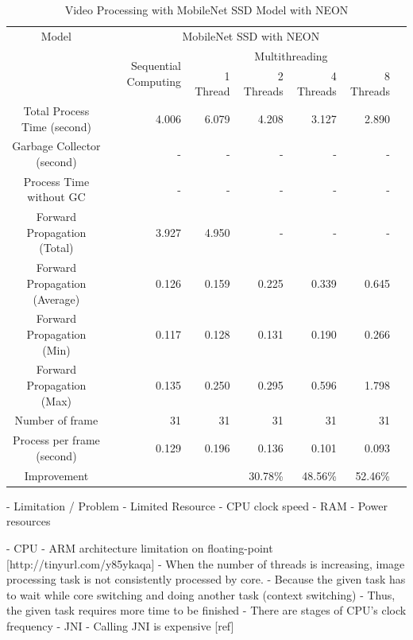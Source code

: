         \begin{table}[!htp]\centering
            \scriptsize
            \begin{tabular}{lrrrrrrr}\toprule
                \multicolumn{2}{c}{Model} &\multicolumn{5}{c}{MobileNet SSD with NEON} \\\cmidrule{1-7}
                \multicolumn{2}{c}{\multirow{2}{*}{}} &\multirow{2}{*}{Sequential Computing} &\multicolumn{4}{c}{Multithreading} \\\cmidrule{4-7}
                & & &1 Thread &2 Threads &4 Threads &8 Threads \\\midrule
                \multicolumn{2}{c}{Total Process Time (second)} &4.006 &6.079 &4.208 &3.127 &2.890 \\
                \multicolumn{2}{c}{Garbage Collector (second)} &- &- &- &- &- \\
                \multicolumn{2}{c}{Process Time without GC} &- &- &- &- &- \\
                \multicolumn{2}{c}{Forward Propagation (Total)} &3.927 &4.950 &- &- &- \\
                \multicolumn{2}{c}{Forward Propagation (Average)} &0.126 &0.159 &0.225 &0.339 &0.645 \\
                \multicolumn{2}{c}{Forward Propagation (Min)} &0.117 &0.128 &0.131 &0.190 &0.266 \\
                \multicolumn{2}{c}{Forward Propagation (Max)} &0.135 &0.250 &0.295 &0.596 &1.798 \\
                \multicolumn{2}{c}{Number of frame} &31 &31 &31 &31 &31 \\
                \multicolumn{2}{c}{Process per frame (second)} &0.129 &0.196 &0.136 &0.101 &0.093 \\
                \multicolumn{2}{c}{Improvement} & & &30.78\% &48.56\% &52.46\% \\
                \bottomrule
            \end{tabular}

            \caption{Video Processing with MobileNet SSD Model with NEON}\label{ssd:neon-performance}
        \end{table}

        -	Limitation / Problem
            - Limited Resource
                - CPU clock speed
                - RAM
                - Power resources

            - CPU
                - ARM architecture limitation on floating-point [http://tinyurl.com/y85ykaqa]
                - When the number of threads is increasing, image processing task is not consistently processed by core.
                    - Because the given task has to wait while core switching and doing another task (context switching)
                    - Thus, the given task requires more time to be finished
                - There are stages of CPU's clock frequency
            - JNI
                - Calling JNI is expensive [ref]


